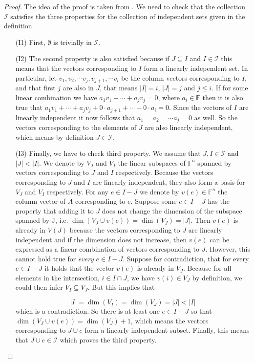 \begin{proof}
    The idea of the proof is taken from \cite[p. 8]{oxley1}.
    We need to check that the collection $\mathcal{I}$ satisfies the three properties for the collection of independent sets given in the definition. 

\begin{enumerate}

    \item[(I1)] First, $\emptyset$ is trivially in $\mathcal{I}$.
    
    \item[(I2)] The second property is also satisfied because if $J \subseteq I$ and $I \in \mathcal{I}$ this means that the vectors corresponding to $I$ form a linearly independent set. In particular, let $v_1, v_2, \cdots v_j, v_{j+1}, \cdots v_{i}$ be the column vectors corresponding to $I$, and that first $j$ are also in $J$, that means $|I| = i$, $|J| = j$ and $j \leq i$. If for some linear combination we have $a_1v_1 + \cdots + a_jv_j = 0$, where $a_i \in \mathbb{F}$ then it is also true that $a_1v_1 + \cdots + a_jv_j + 0 \cdot a_{j+1} + \cdots + 0 \cdot a_i = 0$. Since the vectors of $I$ are linearly independent it now follows that $a_1 = a_2 = \cdots a_j = 0$ as well. So the vectors corresponding to the elements of $J$ are also linearly independent, which means by definition $J \in \mathcal{I}$.

    \item[(I3)] Finally, we have to check third property. We assume that $J, I \in \mathcal{I}$ and $|J| < |I|$. We denote by $V_J$ and $V_I$ the linear subspaces of $\mathbb{F}^n$ spanned by vectors corresponding to $J$ and $I$ respectively. Because the vectors corresponding to $J$ and $I$ are linearly independent, they also form a basis for $V_J$ and $V_I$ respectively. For any $e \in I - J$ we denote by $v(e) \in \mathbb{F}^n$ the column vector of $A$ corresponding to $e$. Suppose some $e \in I - J$ has the property that adding it to $J$ does not change the dimension of the subspace spanned by J, i.e. $\dim (V_J \cup v(e)) = \dim (V_J) = |J|$. Then $v(e)$ is already in $V(J)$ because the vectors corresponding to $J$ are linearly independent and if the dimension does not increase, then $v(e)$ can be expressed as a linear combination of vectors corresponding to $J$. However, this cannot hold true for \textit{every} $e \in I - J$. Suppose for contradiction, that for every $e \in I - J$ it holds that the vector $v(e) $ is already in $ V_J$. Because for all elements in the intersection,  $i \in I \cap J$, we have $v(i) \in V_J$ by definition, we could then infer $V_I \subseteq V_J$. But this implies that 

    $$|I| = \dim(V_I) = \dim(V_J) = |J| < |I|$$
     which is a contradiction. So there is at least one $e \in I - J$ so that $\dim(V_J \cup v(e)) = \dim(V_J) + 1$, which means the vectors corresponding to $J \cup e$ form a linearly independent subset. Finally, this means that $J \cup e \in \mathcal{I}$ which proves the third property.

\end{enumerate}
\end{proof}

